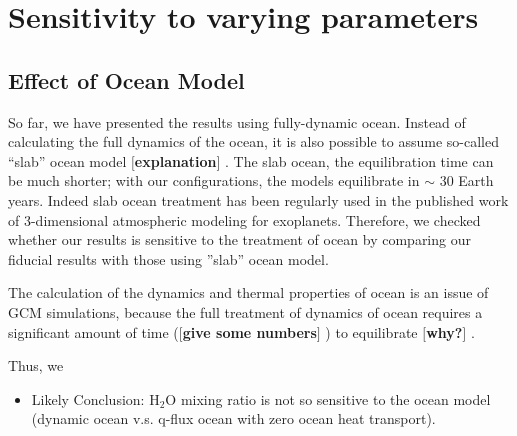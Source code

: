 \documentclass[11pt,numberedappendix,twocolappendix,]{emulateapj}
\def\water{H$_2$O }
\def\memo#1{\color{red}$[${\bf #1}$]$ \color{black}}
\begin{document}
\section{Sensitivity to varying parameters}
\label{s:sensitivity}

\subsection{Effect of Ocean Model}
\label{ss:sensitivity_ocean}

So far, we have presented the results using fully-dynamic ocean. 
Instead of calculating the full dynamics of the ocean, it is also possible to assume so-called ``slab'' ocean model \memo{explanation}. 
The slab ocean, the equilibration time can be much shorter; with our configurations, the models equilibrate in $\sim $ 30 Earth years. 
Indeed slab ocean treatment has been regularly used in the published work of 3-dimensional atmospheric modeling for exoplanets. 
Therefore, we checked whether our results is sensitive to the treatment of ocean by comparing our fiducial results with those using ''slab'' ocean model. 

The calculation of the dynamics and thermal properties of ocean is an issue of GCM simulations, because the full treatment of dynamics of ocean requires a significant amount of time (\memo{give some numbers}) to equilibrate \memo{why?}. 



Thus, we 

\begin{itemize}
\item Likely Conclusion: \water mixing ratio is not so sensitive to the ocean model (dynamic ocean v.s. q-flux ocean with zero ocean heat transport).  
\end{itemize}
\end{document}
